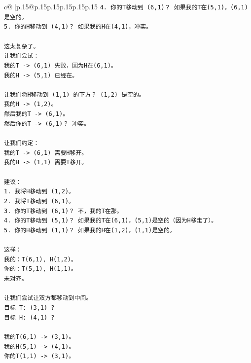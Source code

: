 \documentclass{article}
\begin{document}
{\begin{supertabular}{c@{$\;$}|p{.15\linewidth}@{}p{.15\linewidth}p{.15\linewidth}p{.15\linewidth}p{.15\linewidth}p{.15\linewidth}}
{{{\texttt{4. 你的T移动到 (6,1)？ 如果我的T在(5,1)，(6,1)是空的。} \\
\texttt{5. 你的H移动到 (4,1)？ 如果我的H在(4,1)，冲突。} \\
\\ 
\texttt{这太复杂了。} \\
\texttt{让我们尝试：} \\
\texttt{我的T {-}> (6,1) 失败，因为H在(6,1)。} \\
\texttt{我的H {-}> (5,1) 已经在。} \\
\\ 
\texttt{让我们将H移动到 (1,1) 的下方？ (1,2) 是空的。} \\
\texttt{我的H {-}> (1,2)。} \\
\texttt{然后我的T {-}> (6,1)。} \\
\texttt{然后你的T {-}> (6,1)？ 冲突。} \\
\\ 
\texttt{让我们约定：} \\
\texttt{我的T {-}> (6,1) 需要H移开。} \\
\texttt{我的H {-}> (1,1) 需要T移开。} \\
\\ 
\texttt{建议：} \\
\texttt{1. 我将H移动到 (1,2)。} \\
\texttt{2. 我将T移动到 (6,1)。} \\
\texttt{3. 你的T移动到 (6,1)？ 不，我的T在那。} \\
\texttt{4. 你的T移动到 (5,1)？ 如果我的T在(6,1)，(5,1)是空的（因为H移走了）。} \\
\texttt{5. 你的H移动到 (1,1)？ 如果我的H在(1,2)，(1,1)是空的。} \\
\\ 
\texttt{这样：} \\
\texttt{我的：T(6,1), H(1,2)。} \\
\texttt{你的：T(5,1), H(1,1)。} \\
\texttt{未对齐。} \\
\\ 
\texttt{让我们尝试让双方都移动到中间。} \\
\texttt{目标 T: (3,1) ?} \\
\texttt{目标 H: (4,1) ?} \\
\\ 
\texttt{我的T(6,1) {-}> (3,1)。} \\
\texttt{我的H(5,1) {-}> (4,1)。} \\
\texttt{你的T(1,1) {-}> (3,1)。} \\
}}}
\end{supertabular}}
\end{document}
